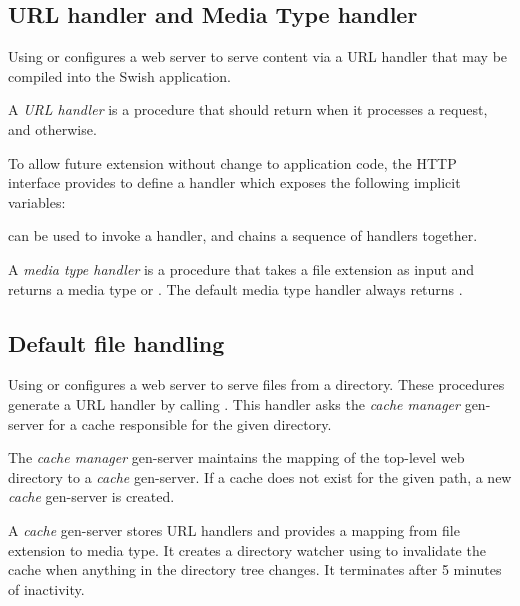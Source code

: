 \subsection{URL handler and Media Type handler}\label{sec:url-handler}

Using  or 
configures a web server to serve content via a URL handler that may be
compiled into the Swish application.

A \emph{URL handler} is a procedure that should
return  when it processes a request, and 
otherwise.

To allow future extension without change to application code, the HTTP
interface provides  to define a handler which
exposes the following implicit variables:

\begin{argtbl}
\end{argtbl}

 can be used to invoke a handler, and
 chains a sequence of handlers
together.

A \emph{media type handler} is a procedure that takes a file extension
as input and returns a media type or . The default media
type handler always returns .

\subsection{Default file handling}

Using  or 
configures a web server to serve files from a directory. These
procedures generate a URL handler by calling
. This handler asks the
\emph{cache manager} gen-server for a cache responsible for the given
directory.

The \emph{cache manager} gen-server maintains the mapping of the
top-level web directory to a \emph{cache} gen-server. If a cache does
not exist for the given path, a new \emph{cache} gen-server is
created.

A \emph{cache} gen-server stores URL handlers and provides a mapping
from file extension to media type. It creates a directory watcher
using  to invalidate the cache when anything in
the directory tree changes. It terminates after 5 minutes of
inactivity.

